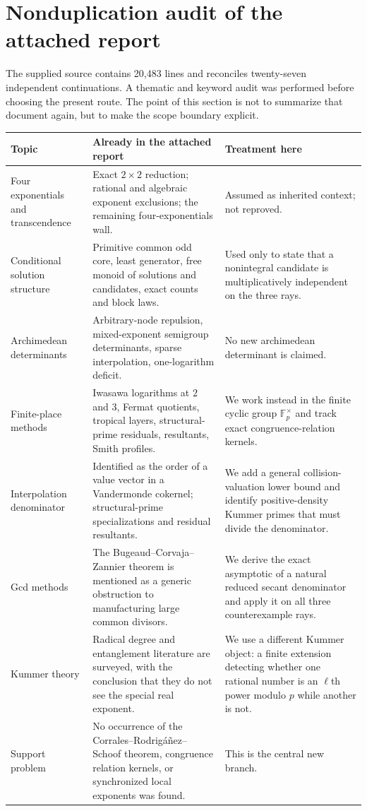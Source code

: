 \documentclass[11pt]{article}
\theoremstyle{definition}
\newcommand{\F}{\mathbb F}
\begin{document}
\section{Nonduplication audit of the attached report}
\label{sec:audit}

The supplied source contains 20,483 lines and reconciles twenty-seven independent
continuations.  A thematic and keyword audit was performed before choosing the present route.
The point of this section is not to summarize that document again, but to make the scope
boundary explicit.

\begin{longtable}{p{}p{}p{}}
\toprule
Topic & Already in the attached report & Treatment here \\
\midrule
\endhead
Four exponentials and transcendence & Exact $2\times2$ reduction; rational and algebraic
exponent exclusions; the remaining four-exponentials wall. & Assumed as inherited context;
not reproved. \\
Conditional solution structure & Primitive common odd core, least generator, free monoid of
solutions and candidates, exact counts and block laws. & Used only to state that a
nonintegral candidate is multiplicatively independent on the three rays. \\
Archimedean determinants & Arbitrary-node repulsion, mixed-exponent semigroup determinants,
sparse interpolation, one-logarithm deficit. & No new archimedean determinant is claimed. \\
Finite-place methods & Iwasawa logarithms at $2$ and $3$, Fermat quotients, tropical layers,
structural-prime residuals, resultants, Smith profiles. & We work instead in the finite cyclic
group $\F_p^\times$ and track exact congruence-relation kernels. \\
Interpolation denominator & Identified as the order of a value vector in a Vandermonde
cokernel; structural-prime specializations and residual resultants. & We add a general
collision-valuation lower bound and identify positive-density Kummer primes that must divide
the denominator. \\
Gcd methods & The Bugeaud--Corvaja--Zannier theorem is mentioned as a generic obstruction to
manufacturing large common divisors. & We derive the exact asymptotic of a natural reduced
secant denominator and apply it on all three counterexample rays. \\
Kummer theory & Radical degree and entanglement literature are surveyed, with the conclusion
that they do not see the special real exponent. & We use a different Kummer object: a finite
extension detecting whether one rational number is an $\ell$th power modulo $p$ while another
is not. \\
Support problem & No occurrence of the Corrales--Rodrig\'a\~nez--Schoof theorem, congruence
relation kernels, or synchronized local exponents was found. & This is the central new branch. \\
\bottomrule
\end{longtable}
\end{document}
